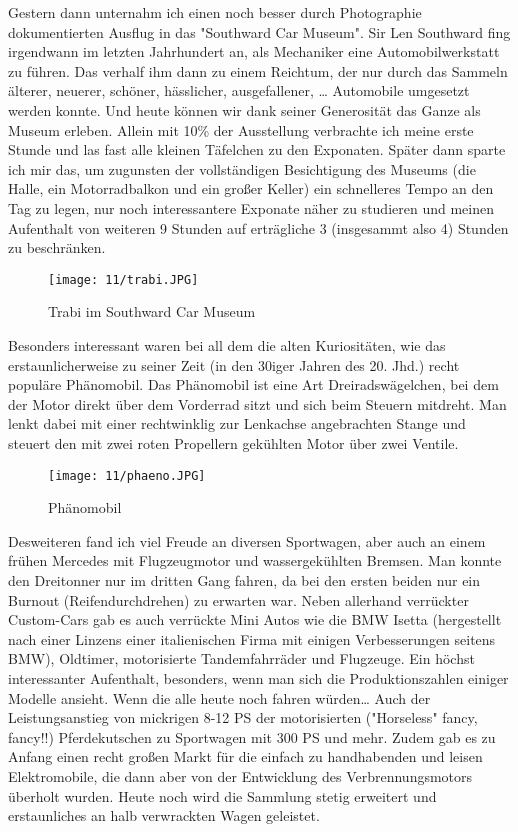 Gestern dann unternahm ich einen noch besser durch Photographie
dokumentierten Ausflug in das "Southward Car Museum". Sir Len Southward
fing irgendwann im letzten Jahrhundert an, als Mechaniker eine
Automobilwerkstatt zu führen. Das verhalf ihm dann zu einem Reichtum,
der nur durch das Sammeln älterer, neuerer, schöner, hässlicher,
ausgefallener, \ldots{} Automobile umgesetzt werden konnte. Und heute
können wir dank seiner Generosität das Ganze als Museum erleben. Allein
mit 10\% der Ausstellung verbrachte ich meine erste Stunde und las fast
alle kleinen Täfelchen zu den Exponaten. Später dann sparte ich mir das,
um zugunsten der vollständigen Besichtigung des Museums (die Halle, ein
Motorradbalkon und ein großer Keller) ein schnelleres Tempo an den Tag
zu legen, nur noch interessantere Exponate näher zu studieren und meinen
Aufenthalt von weiteren 9 Stunden auf erträgliche 3 (insgesammt also 4)
Stunden zu beschränken.

\begin{figure}[h]
  \centering
  \texttt{[image: 11/trabi.JPG]}
  \caption*{Trabi im Southward Car Museum}
\end{figure}

Besonders interessant waren bei all dem die alten Kuriositäten, wie das
erstaunlicherweise zu seiner Zeit (in den 30iger Jahren des 20. Jhd.)
recht populäre Phänomobil. Das Phänomobil ist eine Art
Dreiradswägelchen, bei dem der Motor direkt über dem Vorderrad sitzt und
sich beim Steuern mitdreht. Man lenkt dabei mit einer rechtwinklig zur
Lenkachse angebrachten Stange und steuert den mit zwei roten Propellern
gekühlten Motor über zwei Ventile.
\begin{figure}[h]
  \centering
  \texttt{[image: 11/phaeno.JPG]}
  \caption*{Ph\"anomobil}
\end{figure}

Desweiteren fand ich viel Freude an diversen Sportwagen, aber auch an
einem frühen Mercedes mit Flugzeugmotor und wassergekühlten
Bremsen. Man konnte den Dreitonner nur im dritten Gang fahren, da bei
den ersten beiden nur ein Burnout (Reifendurchdrehen) zu erwarten
war. Neben allerhand verrückter Custom-Cars gab es auch verrückte Mini
Autos wie die BMW Isetta (hergestellt nach einer Linzens einer
italienischen Firma mit einigen Verbesserungen seitens BMW), Oldtimer,
motorisierte Tandemfahrräder und Flugzeuge. Ein höchst interessanter
Aufenthalt, besonders, wenn man sich die Produktionszahlen einiger
Modelle ansieht. Wenn die alle heute noch fahren würden\ldots{} Auch
der Leistungsanstieg von mickrigen 8-12 PS der motorisierten
("Horseless" fancy, fancy!!) Pferdekutschen zu Sportwagen mit 300 PS
und mehr. Zudem gab es zu Anfang einen recht großen Markt für die
einfach zu handhabenden und leisen Elektromobile, die dann aber von
der Entwicklung des Verbrennungsmotors überholt wurden. Heute noch
wird die Sammlung stetig erweitert und erstaunliches an halb
verwrackten Wagen geleistet.


